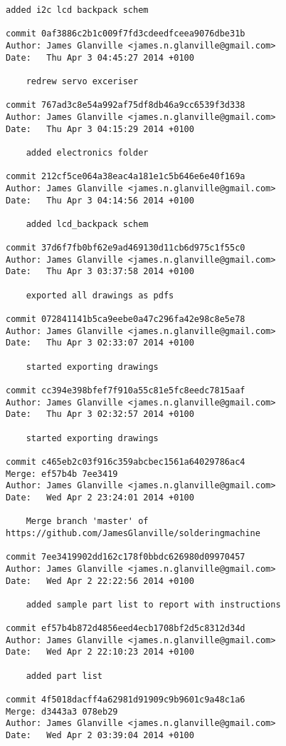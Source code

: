 \documentclass[a4paper,11pt]{article}  %
\begin{document}
\begin{lstlisting}[frame=single]
    added i2c lcd backpack schem

commit 0af3886c2b1c009f7fd3cdeedfceea9076dbe31b
Author: James Glanville <james.n.glanville@gmail.com>
Date:   Thu Apr 3 04:45:27 2014 +0100

    redrew servo exceriser

commit 767ad3c8e54a992af75df8db46a9cc6539f3d338
Author: James Glanville <james.n.glanville@gmail.com>
Date:   Thu Apr 3 04:15:29 2014 +0100

    added electronics folder

commit 212cf5ce064a38eac4a181e1c5b646e6e40f169a
Author: James Glanville <james.n.glanville@gmail.com>
Date:   Thu Apr 3 04:14:56 2014 +0100

    added lcd_backpack schem

commit 37d6f7fb0bf62e9ad469130d11cb6d975c1f55c0
Author: James Glanville <james.n.glanville@gmail.com>
Date:   Thu Apr 3 03:37:58 2014 +0100

    exported all drawings as pdfs

commit 072841141b5ca9eebe0a47c296fa42e98c8e5e78
Author: James Glanville <james.n.glanville@gmail.com>
Date:   Thu Apr 3 02:33:07 2014 +0100

    started exporting drawings

commit cc394e398bfef7f910a55c81e5fc8eedc7815aaf
Author: James Glanville <james.n.glanville@gmail.com>
Date:   Thu Apr 3 02:32:57 2014 +0100

    started exporting drawings

commit c465eb2c03f916c359abcbec1561a64029786ac4
Merge: ef57b4b 7ee3419
Author: James Glanville <james.n.glanville@gmail.com>
Date:   Wed Apr 2 23:24:01 2014 +0100

    Merge branch 'master' of https://github.com/JamesGlanville/solderingmachine

commit 7ee3419902dd162c178f0bbdc626980d09970457
Author: James Glanville <james.n.glanville@gmail.com>
Date:   Wed Apr 2 22:22:56 2014 +0100

    added sample part list to report with instructions

commit ef57b4b872d4856eed4ecb1708bf2d5c8312d34d
Author: James Glanville <james.n.glanville@gmail.com>
Date:   Wed Apr 2 22:10:23 2014 +0100

    added part list

commit 4f5018dacff4a62981d91909c9b9601c9a48c1a6
Merge: d3443a3 078eb29
Author: James Glanville <james.n.glanville@gmail.com>
Date:   Wed Apr 2 03:39:04 2014 +0100


\end{lstlisting}
\end{document}
